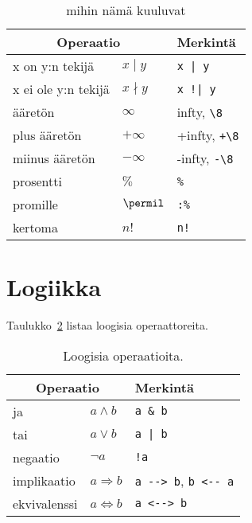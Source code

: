 \begin{table}[ht]
\begin{tabular}{ l|l|l }
\multicolumn{2}{c}{Operaatio} & Merkintä \\ \hline
x on y:n tekijä & $x\mid y$ & \verb$x | y$ \\
x ei ole y:n tekijä & $x\nmid y$ & \verb$x !| y$ \\

ääretön & $\infty$ & infty, \verb$\8$ \\
plus ääretön & $+\infty$ & +infty, \verb$+\8$ \\
miinus ääretön & $-\infty$ & -infty, \verb$-\8$ \\

prosentti & $\percent$ & \verb$%$ \\
promille & $\permil$ & \verb$:%$ \\
kertoma & $n!$ & \verb$n!$ \\
\end{tabular}
\caption{mihin nämä kuuluvat}
\label{tbl:hmm}
\end{table}

\FloatBarrier

\section{Logiikka}
Taulukko~\ref{tbl:logicop} listaa loogisia operaattoreita.

\begin{table}[ht]
\begin{tabular}{ l|l|l }
\multicolumn{2}{c}{Operaatio} & Merkintä \\ \hline
ja & $a \wedge b$ & \verb$a & b$ \\
tai & $a \vee b$ & \verb$a | b$ \\
negaatio & $\neg a$ & \verb$!a$ \\
implikaatio & $a \Rightarrow b$ & \verb$a --> b$, \verb$b <-- a$ \\
ekvivalenssi & $a \Leftrightarrow b$ & \verb$a <--> b$ \\
\end{tabular}
\caption{Loogisia operaatioita.}
\label{tbl:logicop}
\end{table}

